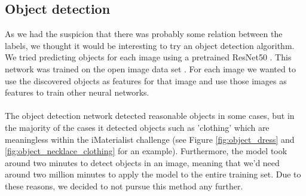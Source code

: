 \documentclass[10pt, a4paper]{article}
\begin{document}
\begin{multicols}{2}
		\subsection{Object detection}
		As we had the suspicion that there was probably some relation between the labels, we thought it would be interesting to try an object detection algorithm. We tried predicting objects for each image using a pretrained ResNet50 \cite{DBLP:journals/corr/HeZRS15}. This network was trained on the open image data set \cite{openimages}. For each image we wanted to use the discovered objects as features for that image and use those images as features to train other neural networks. 
		\\
		\\
		The object detection network detected reasonable objects in some cases, but in the majority of the cases it detected objects such as 'clothing' which are meaningless within the iMaterialist challenge (see Figure \ref{fig:object_dress} and \ref{fig:object_necklace_clothing} for an example). Furthermore, the model took around two minutes to detect objects in an image, meaning that we'd need around two million minutes to apply the model to the entire training set. Due to these reasons, we decided to not pursue this method any further.
		

\end{multicols}
\end{document}
